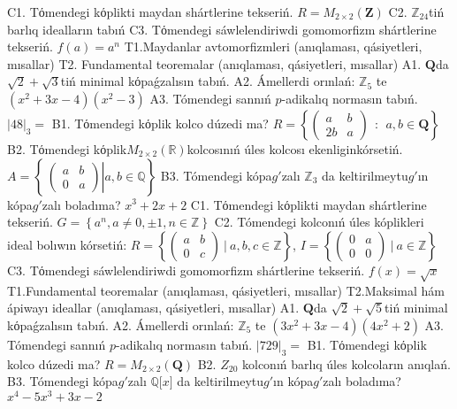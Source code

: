 C1. Tόmendegi kόplikti maydan shártlerine tekseriń. \(R = M_{2 \times 2}\left( \mathbf{Z} \right)\)
C2. \(\mathbb{Z}_{24}\)tiń barlıq idealların tabıń
C3. Tόmendegi sáwlelendiriwdi gomomorfizm shártlerine tekseriń. \(f(a) = a^{n}\)
T1.Maydanlar avtomorfizmleri (anıqlaması, qásiyetleri, mısallar)
T2. Fundamental teoremalar (anıqlaması, qásiyetleri, mısallar)
A1. \(\mathbf{Q}\)da \(\sqrt{2} + \sqrt{3}\)tiń minimal kόpaǵzalısın tabıń.
A2. Ámellerdi orınlań: \(\mathbb{Z}_{5}\) te \(\left( x^{2} + 3x - 4 \right)\left( x^{2} - 3 \right)\)
A3. Tómendegi sannıń \(p\)-adikalıq normasın tabıń. \(|48|_{3} =\)
B1. Tόmendegi kόplik kolco dúzedi ma? \(R = \left\{ \begin{pmatrix}
a & b \\
2b & a
\end{pmatrix}\ \ :\ \ a,b \in \mathbf{Q} \right\}\)
B2. Tόmendegi kόplik\(M_{2 \times 2}\left( \mathbb{R} \right)\)kolcosınıń úles kolcosı ekenliginkórsetiń. \(A = \left\{ \left. \ \begin{pmatrix}
a & b \\
0 & a
\end{pmatrix} \right|a,b\mathbb{\in Q} \right\}\)
B3. Tómendegi kópa\(g'\)zalı \(\mathbb{Z}_{3}\) da keltirilmeytu\(g'\)ın kópa\(g'\)zalı boladıma? \(x^{3} + 2x + 2\)
C1. Tόmendegi kόplikti maydan shártlerine tekseriń. \(G = \left\{ a^{n},a \neq 0, \pm 1,n \in \mathbb{Z} \right\}\)
C2. Tómendegi kolconıń úles kóplikleri ideal bolıwın kórsetiń:
\(R = \left\{ \begin{pmatrix}
a & b \\
0 & c
\end{pmatrix}\ |\ a,b,c \in \mathbb{Z} \right\}\), \(I = \left\{ \begin{pmatrix}
0 & a \\
0 & 0
\end{pmatrix}\ |\ a \in \mathbb{Z} \right\}\)
C3. Tόmendegi sáwlelendiriwdi gomomorfizm shártlerine tekseriń. \(f(x) = \sqrt{x}\)
T1.Fundamental teoremalar (anıqlaması, qásiyetleri, mısallar)
T2.Maksimal hám ápiwayı ideallar (anıqlaması, qásiyetleri, mısallar)
A1. \(\mathbf{Q}\)da \(\sqrt{2} + \sqrt{5}\)tiń minimal kόpaǵzalısın tabıń.
A2. Ámellerdi orınlań: \(\mathbb{Z}_{5}\) te \(\left( 3x^{2} + 3x - 4 \right)\left( 4x^{2} + 2 \right)\)
A3. Tómendegi sannıń \(p\)-adikalıq normasın tabıń. \(|729|_{3} =\)
B1. Tόmendegi kόplik kolco dúzedi ma? \(R = M_{2 \times 2}\left( \mathbf{Q} \right)\)
B2. \(Z_{20}\) kolconıń barlıq úles kolcoların anıqlań.
B3. Tómendegi kópa\(g'\)zalı \(\mathbb{Q\lbrack}x\rbrack\) da keltirilmeytu\(g'\)ın kópa\(g'\)zalı boladıma? \(x^{4} - 5x^{3} + 3x - 2\)
